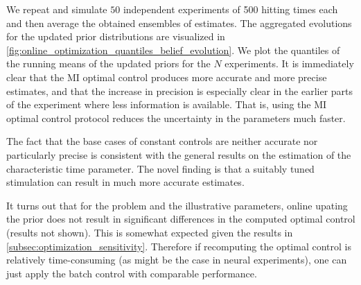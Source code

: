 \documentclass[12pt]{article}
\begin{document}
We repeat and simulate $50$ independent experiments of 500 hitting times each and
then average the obtained ensembles of estimates.
The aggregated evolutions for the updated prior distributions are visualized in
\cref{fig:online_optimization_quantiles_belief_evolution}. We plot the
quantiles of the running means of the updated priors for the  $N$
experiments. It is immediately clear that the MI optimal control produces more accurate and
more precise estimates, and that the increase in precision is especially clear in the earlier parts of the
experiment where less information is available. That is, using the MI optimal
control protocol reduces the uncertainty in the parameters much faster.

The fact that the base cases of constant controls are neither accurate nor
particularly precise is consistent with the general results on the estimation of
the characteristic time parameter. The novel finding is that a
suitably tuned stimulation can result in much more accurate estimates.

It turns out that for the problem and the illustrative parameters, online
upating the prior does not result in significant differences in the computed optimal control (results not shown).
This is somewhat expected given the results in
\cref{subsec:optimization_sensitivity}. Therefore if recomputing the optimal
control is relatively time-consuming (as might be the case in neural
experiments), one can just apply the batch control with comparable performance.



 

\end{document}
